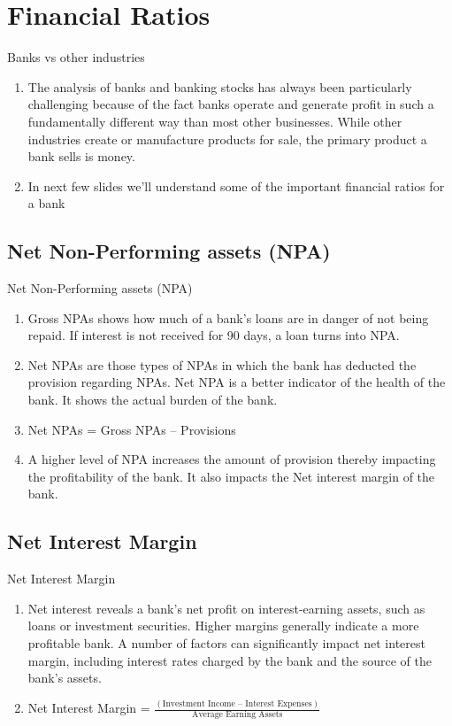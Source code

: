 \documentclass{beamer}
\begin{document}
\section{Financial Ratios}
\begin{frame}{Banks vs other industries}
\begin{enumerate}
\item The analysis of banks and banking stocks has always been particularly challenging because of the fact banks operate and generate profit in such a fundamentally different way than most other businesses. While other industries create or manufacture products for sale, the primary product a bank sells is money.
\item In next few slides we'll understand some of the important financial ratios for a bank
\end{enumerate}

\end{frame}

\subsection{Net Non-Performing assets (NPA)}
\begin{frame}{Net Non-Performing assets (NPA)}
		\begin{enumerate}
	\item Gross NPAs shows how much of a bank’s loans are in danger of not being repaid. If interest is not received for 90 days, a loan turns into NPA.
	\item Net NPAs are those types of NPAs in which the bank has deducted the provision regarding NPAs. Net NPA is a better indicator of the health of the bank. It shows the actual burden of the bank.
	\item Net NPAs = Gross NPAs – Provisions
	\item A higher level of NPA increases the amount of provision thereby impacting the profitability of the bank. It also impacts the Net interest margin of the bank.
	\end{enumerate}
\end{frame}

\subsection{Net Interest Margin}
\begin{frame}{Net Interest Margin}
	\begin{enumerate}
	\item Net interest reveals a bank’s net profit on interest-earning assets, such as loans or investment securities. Higher margins generally indicate a more profitable bank. A number of factors can significantly impact net interest margin, including interest rates charged by the bank and the source of the bank's assets.
	\item Net Interest Margin = $\frac{(\text{Investment Income – Interest Expenses})}{\text{Average Earning Assets}}$
	\end{enumerate}
\end{frame}
\end{document}
